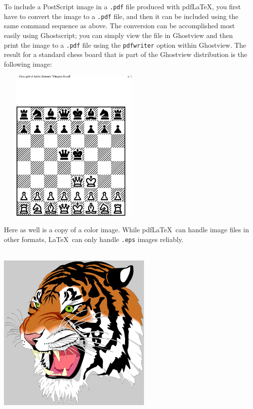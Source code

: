 \documentclass{entcs} \usepackage{entcsmacro}
\begin{document}
To include a PostScript image in a \texttt{.pdf} file produced
with pdf\LaTeX, you first have to convert the image to a
\texttt{.pdf} file, and then it can be included using the same
command sequence as above. The conversion can be accomplished
most easily using Ghostscript; you can simply view the file in
Ghostview and then print the image to a \texttt{.pdf} file using
the \verb+pdfwriter+ option within Ghostview. The result for a
standard chess board that is part of the Ghostview distribution
is the following image:\\
\begin{center}
  \includegraphics[height=3in,width=3in]{chess.eps}
\end{center}
Here as well is a copy of a color image. While pdf\LaTeX\ can
handle image files in other formats, \LaTeX\ can only handle
\texttt{.eps} images reliably.\\
\begin{center}
  \includegraphics[height=3.5in,width=3in]{tigre.eps}
\end{center}
\end{document}
